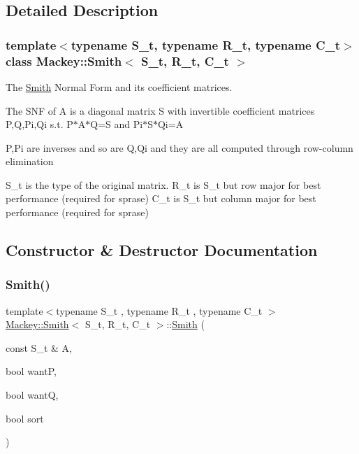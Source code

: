 \subsection{Detailed Description}
\subsubsection*{template$<$typename S\+\_\+t, typename R\+\_\+t, typename C\+\_\+t$>$\newline
class Mackey\+::\+Smith$<$ S\+\_\+t, R\+\_\+t, C\+\_\+t $>$}

The \hyperlink{classMackey_1_1Smith}{Smith} Normal Form and its coefficient matrices. 

The S\+NF of A is a diagonal matrix S with invertible coefficient matrices P,Q,Pi,Qi s.\+t. P$\ast$\+A$\ast$Q=S and Pi$\ast$\+S$\ast$\+Qi=A

P,Pi are inverses and so are Q,Qi and they are all computed through row-\/column elimination

S\+\_\+t is the type of the original matrix. R\+\_\+t is S\+\_\+t but row major for best performance (required for sprase) C\+\_\+t is S\+\_\+t but column major for best performance (required for sprase) 

\subsection{Constructor \& Destructor Documentation}
\mbox{\label{classMackey_1_1Smith_ab366b0cccb7fe065521142c442a0dcd3}} 
\subsubsection{\texorpdfstring{Smith()}{Smith()}}
{\footnotesize\ttfamily template$<$typename S\+\_\+t , typename R\+\_\+t , typename C\+\_\+t $>$ \\
\hyperlink{classMackey_1_1Smith}{Mackey\+::\+Smith}$<$ S\+\_\+t, R\+\_\+t, C\+\_\+t $>$\+::\hyperlink{classMackey_1_1Smith}{Smith} (\begin{DoxyParamCaption}\item[{const S\+\_\+t \&}]{A,  }\item[{bool}]{wantP,  }\item[{bool}]{wantQ,  }\item[{bool}]{sort }\end{DoxyParamCaption})\hspace{0.3cm}{\ttfamily [protected]}}




